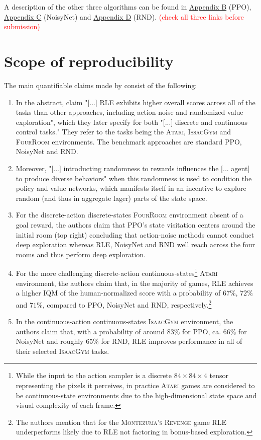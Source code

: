 \documentclass[10pt]{article} %
\begin{document}
\noindent A description of the other three algorithms can be found in \hyperlink{algo-ppo}{Appendix B} (PPO), \hyperlink{algo-noisynet}{Appendix C} (NoisyNet) and \hyperlink{algo-rnd}{Appendix D} (RND). \textcolor{red}{(check all three links before submission)}

\section{Scope of reproducibility}
\label{sec:claims}

\noindent The main quantifiable claims made by \cite{rle-paper} consist of the following:

\begin{enumerate}
    \item In the abstract, \cite{rle-paper} claim "[...] RLE exhibits higher overall scores across all of the tasks than other approaches, including action-noise and randomized value exploration", which they later specify for both "[...] discrete and continuous control tasks." They refer to the tasks being the \textsc{Atari}, \textsc{IssacGym} and \textsc{FourRoom} environments. The benchmark approaches are standard PPO, NoisyNet and RND.
    \item Moreover, "[...] introducting randomness to rewards influences the [... agent] to produce diverse behaviors" \citep{rle-paper} when this randomness is used to condition the policy and value networks, which manifests itself in an incentive to explore random (and thus in aggregate lager) parts of the state space.
    \item For the discrete-action discrete-states \textsc{FourRoom} environment absent of a goal reward, the authors claim that PPO's state visitation centers around the initial room (top right) concluding that action-noise methods cannot conduct deep exploration whereas RLE, NoisyNet and RND well reach across the four rooms and thus perform deep exploration.
    \item For the more challenging discrete-action continuous-states\footnote{While the input to the action sampler is a discrete $84\times84\times4$ tensor representing the pixels it perceives, in practice \textsc{Atari} games are considered to be continuous-state environments due to the high-dimensional state space and visual complexity of each frame.} \textsc{Atari} environment, the authors claim that, in the majority of games, RLE achieves a higher IQM of the human-normalized score with a probability of $67\%$, $72\%$ and $71\%$, compared to PPO, NoisyNet and RND, respectively.\footnote{The authors mention that for the \textsc{Montezuma's Revenge} game RLE underperforms likely due to RLE not factoring in bonus-based exploration.}
    \item In the continuous-action continuous-states \textsc{IsaacGym} environment, the authors claim that, with a probability of around $83\%$ for PPO, ca. $66\%$ for NoisyNet and roughly $65\%$ for RND, RLE improves performance in all of their selected \textsc{IsaacGym} tasks.
\end{enumerate}
\end{document}
